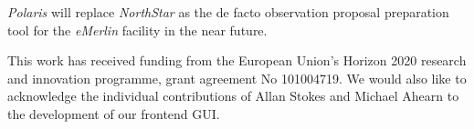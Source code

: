 \documentclass[11pt,twoside]{article}
\begin{document}
\emph{Polaris} will replace \emph{NorthStar} as the de facto observation proposal preparation tool for
the \emph{eMerlin} facility in the near future.

\acknowledgements This work has received funding from the European Union's Horizon 2020 research and innovation programme, grant agreement No 101004719.
We would also like to acknowledge the individual contributions of Allan Stokes and Michael Ahearn to the development of our frontend GUI\@.


\end{document}
